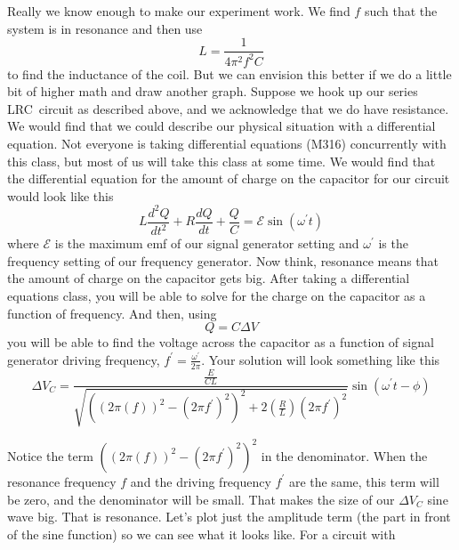 Really we know enough to make our experiment work. We find $f$ such that the system is in resonance and then use 
\begin{equation*}
	L=\frac{1}{4\pi ^{2}f^{2}C}
\end{equation*}
to find the inductance of the coil. But we can envision this better if we do a little bit of higher math and draw another graph. Suppose we hook up our series LRC\ circuit as described above, and we acknowledge that we do have resistance. We would find that we could describe our physical situation with a differential equation. Not everyone is taking differential equations (M316) concurrently with this class, but most of us will take this class at some time. We would find that the differential equation for the amount of charge on the capacitor for our circuit would look like this
\begin{equation*}
	L\frac{d^{2}Q}{dt^{2}}+R\frac{dQ}{dt}+\frac{Q}{C}=\mathcal{E}\sin \left(\omega ^{\prime }t\right)
\end{equation*}
where $\mathcal{E}$ is the maximum emf of our signal generator setting and $\omega ^{\prime }$ is the frequency setting of our frequency generator. Now think, resonance means that the amount of charge on the capacitor gets big. After taking a differential equations class, you will be able to solve for the charge on the capacitor as a function of frequency. And then, using 
\begin{equation*}
Q=C\Delta V
\end{equation*}
you will be able to find the voltage across the capacitor as a function of signal generator driving frequency, $f^{\prime }=\frac{\omega ^{\prime }}{2\pi }.$ Your solution will look something like this 
\begin{equation*}
	\Delta V_{C}=\frac{\frac{E}{CL}}{\sqrt{\left( \left( 2\pi \left( f\right)\right) ^{2}-\left( 2\pi f^{\prime }\right) ^{2}\right) ^{2}+2\left( \frac{R}{L}\right) \left( 2\pi f^{\prime }\right) ^{2}}}\sin \left( \omega ^{\prime}t-\phi \right)
\end{equation*}

Notice the term $\left( \left( 2\pi \left( f\right) \right)^{2}-\left( 2\pi f^{\prime }\right) ^{2}\right) ^{2}$ in the denominator. When the resonance frequency $f$ and the driving frequency $f^{\prime }$ are the same, this term will be zero, and the denominator will be small. That makes the size of our $\Delta V_{C}$ sine wave big. That is resonance. Let's plot just the amplitude term (the part in front of the sine function) so we can see what it looks like. For a circuit with

